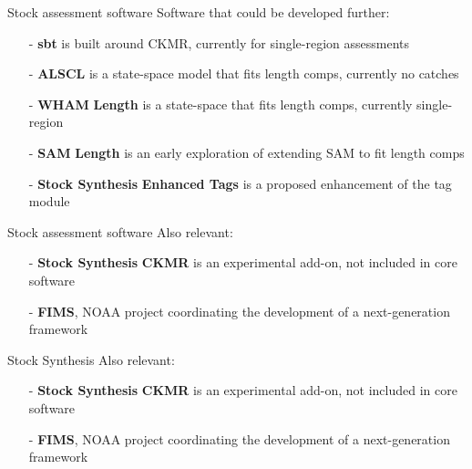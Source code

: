 \documentclass[aspectratio=169,fleqn]{beamer}
\begin{document}
\begin{frame}{Stock assessment software}
  Software that could be developed further:\\[3ex]
  \begin{itemize}
    \item[-] {\bf sbt} is built around CKMR, currently for single-region
    assessments\\[3ex]
    \item[-] {\bf ALSCL} is a state-space model that fits length comps, currently
    no catches\\[3ex]
    \item[-] {\bf WHAM$\,$\raisebox{0.15ex}{+}$\,$Length} is a state-space that fits
    length comps, currently single-region\\[3ex]
    \item[-] {\bf SAM$\,$\raisebox{0.15ex}{+}$\,$Length} is an early exploration
    of extending SAM to fit length comps\\[3ex]
    \item[-] {\bf Stock Synthesis$\,$\raisebox{0.15ex}{+}$\,$Enhanced Tags} is a
    proposed enhancement of the tag module\\[2ex]
  \end{itemize}
\end{frame}


\begin{frame}{Stock assessment software}
  Also relevant:\\[4ex]
  \begin{itemize}
    \item[-] {\bf Stock Synthesis$\,$\raisebox{0.15ex}{+}$\,$CKMR} is an
    experimental add-on, not included in core software\\[4ex]
    \item[-] {\bf FIMS}, NOAA project coordinating the development of a
    next-generation framework\\[6ex]
  \end{itemize}
\end{frame}


\begin{frame}{Stock Synthesis}
  Also relevant:\\[4ex]
  \begin{itemize}
    \item[-] {\bf Stock Synthesis$\,$\raisebox{0.15ex}{+}$\,$CKMR} is an
    experimental add-on, not included in core software\\[4ex]
    \item[-] {\bf FIMS}, NOAA project coordinating the development of a
    next-generation framework\\[6ex]
  \end{itemize}
\end{frame}
\end{document}
